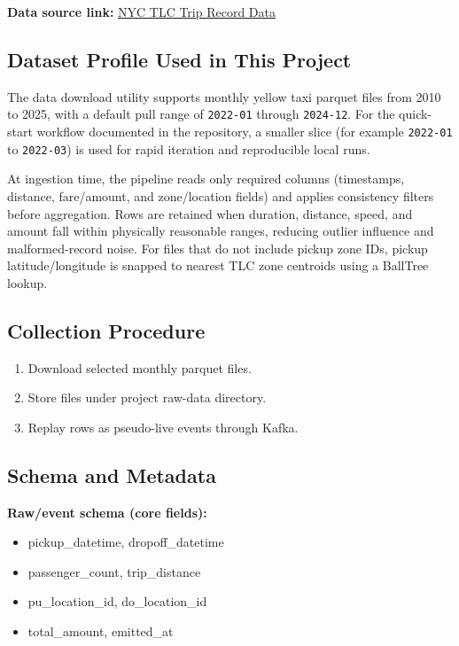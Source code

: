 \documentclass[conference]{IEEEtran}
\begin{document}
\textbf{Data source link:} \href{https://www.nyc.gov/site/tlc/about/tlc-trip-record-data.page}{NYC TLC Trip Record Data}~\cite{tlc}

\subsection{Dataset Profile Used in This Project}
The data download utility supports monthly yellow taxi parquet files from 2010 to 2025, with a default pull range of \texttt{2022{-}01} through \texttt{2024{-}12}. For the quick-start workflow documented in the repository, a smaller slice (for example \texttt{2022{-}01} to \texttt{2022{-}03}) is used for rapid iteration and reproducible local runs.

At ingestion time, the pipeline reads only required columns (timestamps, distance, fare/amount, and zone/location fields) and applies consistency filters before aggregation. Rows are retained when duration, distance, speed, and amount fall within physically reasonable ranges, reducing outlier influence and malformed-record noise. For files that do not include pickup zone IDs, pickup latitude/longitude is snapped to nearest TLC zone centroids using a BallTree lookup.

\subsection{Collection Procedure}
\begin{enumerate}[leftmargin=1.5em]
    \item Download selected monthly parquet files.
    \item Store files under project raw-data directory.
    \item Replay rows as pseudo-live events through Kafka.
\end{enumerate}

\subsection{Schema and Metadata}
\textbf{Raw/event schema (core fields):}
\begin{itemize}[leftmargin=1.5em]
    \item pickup\_datetime, dropoff\_datetime
    \item passenger\_count, trip\_distance
    \item pu\_location\_id, do\_location\_id
    \item total\_amount, emitted\_at
\end{itemize}
\end{document}
